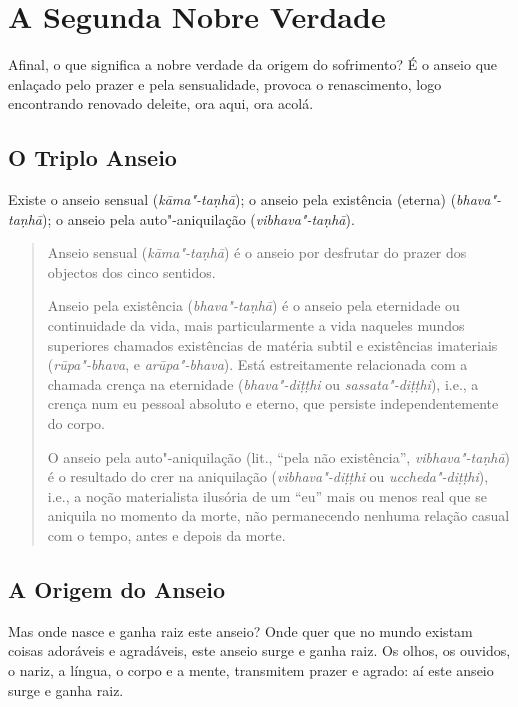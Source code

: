 
\chapter{A Segunda Nobre Verdade}


Afinal, o que significa a nobre verdade da origem do sofrimento? É o anseio que enlaçado pelo prazer e pela sensualidade, provoca o renascimento, logo encontrando renovado deleite, ora aqui, ora acolá.

\section{O Triplo Anseio}

Existe o anseio sensual (\emph{kāma"-taṇhā}); o anseio pela existência (eterna) (\emph{bhava"-taṇhā}); o anseio pela auto"-aniquilação (\emph{vibhava"-taṇhā}).


\begin{quote}
Anseio sensual (\emph{kāma"-ta\d{n}hā}) é o anseio por desfrutar do
prazer dos objectos dos cinco sentidos.

Anseio pela existência (\emph{bhava"-ta\d{n}hā}) é o anseio pela eternidade ou 
continuidade da vida, mais particularmente a vida naqueles mundos superiores chamados
existências de matéria subtil e existências imateriais (\emph{rūpa"-bhava}, e
\emph{arūpa"-bhava}). Está estreitamente relacionada com a chamada crença na
eternidade (\emph{bhava"-di\d{t}\d{t}hi} ou \emph{sassata"-di\d{t}\d{t}hi}), i.e.,
a crença num eu pessoal absoluto e eterno, que persiste independentemente do corpo.

O anseio pela auto"-aniquilação (lit., “pela não existência”,
\emph{vibhava"-ta\d{n}hā}) é o resultado do crer na aniquilação
(\emph{vibhava"-di\d{t}\d{t}hi} ou \emph{uccheda"-di\d{t}\d{t}hi}), i.e., a noção
materialista ilusória de um “eu” mais ou menos real que se aniquila no momento
da morte, não permanecendo nenhuma relação casual com o tempo, antes e depois da
morte.
\end{quote}

\section{A Origem do Anseio}

Mas onde nasce e ganha raiz este anseio? Onde quer que no mundo existam coisas
adoráveis e agradáveis, este anseio surge e ganha raiz. Os olhos, os ouvidos, o
nariz, a língua, o corpo e a mente, transmitem prazer e agrado: aí este anseio
surge e ganha raiz.

